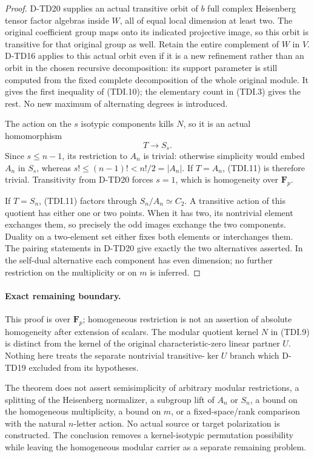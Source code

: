 \begin{proof}
D-TD20 supplies an actual transitive orbit of \(b\) full complex
Heisenberg tensor factor algebras inside \(W\), all of equal local
dimension at least two. The original coefficient group maps onto
its indicated projective image, so this orbit is transitive for
that original group as well. Retain the entire complement of \(W\)
in \(V\). D-TD16 applies to this actual orbit even if it is a new
refinement rather than an orbit in the chosen recursive decomposition:
its support parameter is still computed from the fixed complete
decomposition of the whole original module. It gives the first
inequality of (TDI.10); the elementary count in (TDI.3) gives the rest.
No new maximum of alternating degrees is introduced.

The action on the \(s\) isotypic components kills \(N\), so it
is an actual homomorphism
\[
                              T\longrightarrow S_s.
 \tag{TDI.11}
\]
Since \(s\le n-1\), its restriction to \(A_n\) is trivial:
otherwise simplicity would embed \(A_n\) in \(S_s\), whereas
\(s!\le(n-1)!<n!/2=|A_n|\). If \(T=A_n\), (TDI.11)
is therefore trivial. Transitivity from D-TD20 forces \(s=1\),
which is homogeneity over \(\mathbf F_p\).

If \(T=S_n\), (TDI.11) factors through \(S_n/A_n\simeq C_2\).
A transitive action of this quotient has either one or two points.
When it has two, its nontrivial element exchanges them, so precisely
the odd images exchange the two components. Duality on a two-element
set either fixes both elements or interchanges them. The pairing
statements in D-TD20 give exactly the two alternatives asserted.
In the self-dual alternative each component has even dimension;
no further restriction on the multiplicity or on \(m\) is inferred.
\end{proof}

\paragraph{Exact remaining boundary.}
This proof is over \(\mathbf F_p\); homogeneous restriction is not
an assertion of absolute homogeneity after extension of scalars.
The modular quotient kernel \(N\) in (TDI.9) is distinct from the
kernel of the original characteristic-zero linear partner \(U\).
Nothing here treats the separate nontrivial transitive-\(\ker U\)
branch which D-TD19 excluded from its hypotheses.

The theorem does not assert semisimplicity of arbitrary modular
restrictions, a splitting of the Heisenberg normalizer, a subgroup
lift of \(A_n\) or \(S_n\), a bound on the homogeneous multiplicity,
a bound on \(m\), or a fixed-space/rank comparison with the natural
\(n\)-letter action. No actual source or target polarization is
constructed. The conclusion removes a kernel-isotypic permutation
possibility while leaving the homogeneous modular carrier as a
separate remaining problem.
